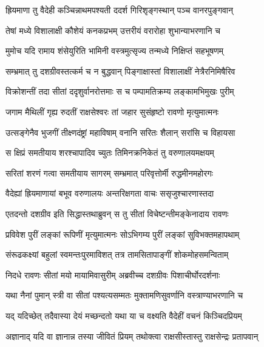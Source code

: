 
\twolineshloka
{ह्रियमाणा तु वैदेही कञ्चिन्नाथमपश्यती}
{ददर्श गिरिशृङ्गस्थान् पञ्च वानरपुङ्गवान्} %

\twolineshloka
{तेषां मध्ये विशालाक्षी कौशेयं कनकप्रभम्}
{उत्तरीयं वरारोहा शुभान्याभरणानि च} %

\twolineshloka
{मुमोच यदि रामाय शंसेयुरिति भामिनी}
{वस्त्रमुत्सृज्य तन्मध्ये निक्षिप्तं सहभूषणम्} %

\twolineshloka
{सम्भ्रमात् तु दशग्रीवस्तत्कर्म च न बुद्धवान्}
{पिङ्गाक्षास्तां विशालाक्षीं नेत्रैरनिमिषैरिव} %

\twolineshloka
{विक्रोशन्तीं तदा सीतां ददृशुर्वानरोत्तमाः}
{स च पम्पामतिक्रम्य लङ्कामभिमुखः पुरीम्} %

\twolineshloka
{जगाम मैथिलीं गृह्य रुदतीं राक्षसेश्वरः}
{तां जहार सुसंहृष्टो रावणो मृत्युमात्मनः} %

\twolineshloka
{उत्सङ्गेनैव भुजगीं तीक्ष्णदंष्ट्रां महाविषाम्}
{वनानि सरितः शैलान् सरांसि च विहायसा} %

\twolineshloka
{स क्षिप्रं समतीयाय शरश्चापादिव च्युतः}
{तिमिनक्रनिकेतं तु वरुणालयमक्षयम्} %

\twolineshloka
{सरितां शरणं गत्वा समतीयाय सागरम्}
{सम्भ्रमात् परिवृत्तोर्मी रुद्धमीनमहोरगः} %

\twolineshloka
{वैदेह्यां ह्रियमाणायां बभूव वरुणालयः}
{अन्तरिक्षगता वाचः ससृजुश्चारणास्तदा} %

\twolineshloka
{एतदन्तो दशग्रीव इति सिद्धास्तथाब्रुवन्}
{स तु सीतां विचेष्टन्तीमङ्केनादाय रावणः} %

\twolineshloka
{प्रविवेश पुरीं लङ्कां रूपिणीं मृत्युमात्मनः}
{सोऽभिगम्य पुरीं लङ्कां सुविभक्तमहापथाम्} %

\twolineshloka
{संरूढकक्ष्यां बहुलां स्वमन्तःपुरमाविशत्}
{तत्र तामसितापाङ्गीं शोकमोहसमन्विताम्} %

\twolineshloka
{निदधे रावणः सीतां मयो मायामिवासुरीम्}
{अब्रवीच्च दशग्रीवः पिशाचीर्घोरदर्शनाः} %

\twolineshloka
{यथा नैनां पुमान् स्त्री वा सीतां पश्यत्यसम्मतः}
{मुक्तामणिसुवर्णानि वस्त्राण्याभरणानि च} %

\twolineshloka
{यद् यदिच्छेत् तदैवास्या देयं मच्छन्दतो यथा}
{या च वक्ष्यति वैदेहीं वचनं किञ्चिदप्रियम्} %

\twolineshloka
{अज्ञानाद् यदि वा ज्ञानान्न तस्या जीवितं प्रियम्}
{तथोक्त्वा राक्षसीस्तास्तु राक्षसेन्द्रः प्रतापवान्} %

